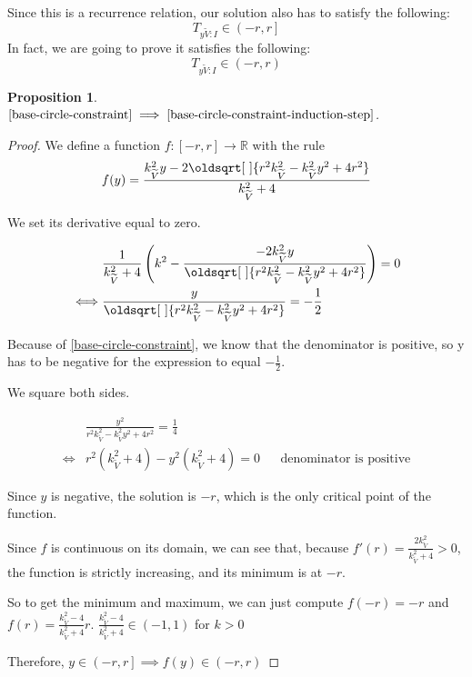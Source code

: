 \documentclass[a4paper,12pt]{article}
\newcommand{\HSview}[1][V]{\widetilde{#1}}
\newcommand{\HSTy}[1][I]{T_{y\HSview:#1}}
\renewcommand*{\sqrt}[2][\ ]{\oldsqrt[#1]{#2} }
\newtheorem{proposition}[theorem]{Proposition}
\theoremstyle{definition}
\theoremstyle{plain}
\begin{document}
	Since this is a recurrence relation, our solution also has to satisfy the following:
	$$\HSTy \in \left(-r, r\right]$$
	In fact, we are going to prove it satisfies the following:
	\begin{equation}
		\HSTy \in \left(-r, r\right)\label{base-circle-constraint-induction-step}
	\end{equation}
	
	\newpage

	\begin{proposition}
		$\eqref{base-circle-constraint} \implies \eqref{base-circle-constraint-induction-step}$.
	\end{proposition}
	

	\begin{proof}
		We define a function $f : \left[-r, r\right] \to \mathbb{R}$ with the rule
		$$f(y) = \frac{
			k^2_{\HSview}y - 2\sqrt{
				r^2k^2_{\HSview} -
				k^2_{\HSview}y^2 +
				4r^2
			}
		}{k^2_{\HSview} + 4}$$

		We set its derivative equal to zero.

		\begin{align*}
			&\frac{1}{k^2_{\HSview} + 4}\left(k^2 - \frac{-2k^2_{\HSview}y}{\sqrt{r^2k^2_{\HSview} - k^2_{\HSview}y^2 + 4r^2}}\right) = 0\\
			\iff&\frac{y}{\sqrt{r^2k^2_{\HSview} - k^2_{\HSview}y^2 + 4r^2}} = -\frac{1}{2}
		\end{align*}

		Because of \eqref{base-circle-constraint}, we know that the denominator is positive, so y has to be negative for the expression to equal $-\frac{1}{2}$.

		We square both sides.
		
		\begin{align*}
			&\frac{y^2}{r^2k^2_{\HSview} - k^2_{\HSview}y^2 + 4r^2} = \frac{1}{4}\\
			\iff&r^2\left(k^2_{\HSview} + 4\right) - y^2\left(k^2_{\HSview} + 4\right) = 0 && \text{denominator is positive}
		\end{align*}

		Since $y$ is negative, the solution is $-r$, which is the only critical point of the function.

		Since $f$ is continuous on its domain, we can see that, because $f'(r) = \frac{2k^2_{\HSview}}{k^2_{\HSview} + 4} > 0$,
		the function is strictly increasing, and its minimum is at $-r$.

		So to get the minimum and maximum, we can just compute $f(-r) = -r$ and $f(r) = \frac{k^2_{\HSview} - 4}{k^2_{\HSview} + 4}r$.
		$\frac{k^2_{\HSview} - 4}{k^2_{\HSview} + 4} \in \left(-1, 1\right)$ for $k > 0$

		Therefore, $y \in \left(-r, r\right] \implies f(y) \in \left(-r, r\right)$

	\end{proof}
	\newpage
	
\end{document}
